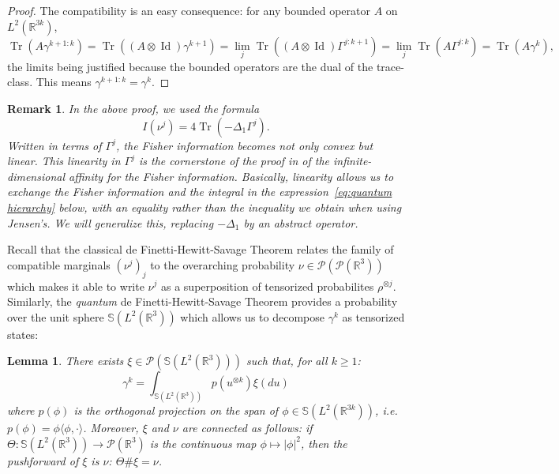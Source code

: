 \documentclass[11pt,a4paper]{article}
\theoremstyle{definition}
\theoremstyle{plain}
\newtheorem{lemma}[defi]{Lemma}
\newtheorem{remark}[defi]{Remark}
\DeclareMathOperator*{\Id}{Id}
\DeclareMathOperator*{\Tr}{Tr}
\begin{document}
\begin{proof}
    The compatibility is an easy consequence: for any bounded operator $A$ on $L^2(\mathbb{R}^{3k})$,
    $$\Tr(A \gamma^{k+1:k})=\Tr((A\otimes \Id)  \gamma^{k+1})=\lim_j \Tr((A\otimes \Id)  \Gamma^{j:k+1})=\lim_j \Tr(A  \Gamma^{j:k})=\Tr(A \gamma^{k}),$$
    the limits being justified because the bounded operators are the dual of the trace-class. This means $\gamma^{k+1:k}=\gamma^{k}$.
\end{proof}
\begin{remark}
    In the above proof, we used the formula
    $$I(\nu^j)=4\Tr(-\Delta_1 \Gamma^j).$$
    Written in terms of $\Gamma^j$, the Fisher information becomes not only convex but linear. This linearity in $\Gamma^j$ is the cornerstone of the proof in \cite{Rougerie2020} of the infinite-dimensional affinity for the Fisher information. Basically, linearity allows us to exchange the Fisher information and the integral in the expression~\eqref{eq:quantum hierarchy} below, with an equality rather than the inequality we obtain when using Jensen's. We will generalize this, replacing $-\Delta_1$ by an abstract operator.
\end{remark}
Recall that the classical de Finetti-Hewitt-Savage Theorem relates the family of compatible marginals $(\nu^j)_j$ to the overarching probability $\nu \in \mathcal{P}(\mathcal{P}(\mathbb{R}^3))$ which makes it able to write $\nu^j$ as a superposition of tensorized probabilites $\rho^{\otimes j}$. Similarly, the \textit{quantum} de Finetti-Hewitt-Savage Theorem provides a probability over the unit sphere $\mathbb{S}(L^2(\mathbb{R}^3))$ which allows us to decompose $\gamma^k$ as tensorized states:
\begin{lemma}
\label{lem:quantum hierarchy}
    There exists $\xi\in \mathcal{P}(\mathbb{S}(L^2(\mathbb{R}^3)))$ such that, for all $k\geq 1$:
    \begin{equation}
        \label{eq:quantum hierarchy}
        \gamma^k =\int_{\mathbb{S}(L^2(\mathbb{R}^3))} p(u^{\otimes k}) \xi(du)
    \end{equation}
    where $p(\phi)$ is the orthogonal projection on the span of $\phi\in \mathbb{S}(L^2(\mathbb{R}^{3k}))$, \textit{i.e.} $p(\phi)=\phi\langle\phi,\cdot\rangle$.
    Moreover, $\xi$ and $\nu$ are connected as follows: if $\Theta:\mathbb{S}(L^2(\mathbb{R}^{3}))\rightarrow \mathcal{P}(\mathbb{R}^3) $ is the continuous map $\phi \mapsto \vert \phi\vert^2$, then
    the pushforward of $\xi$ is $\nu$: $\Theta \# \xi=\nu$.
\end{lemma}
\end{document}
